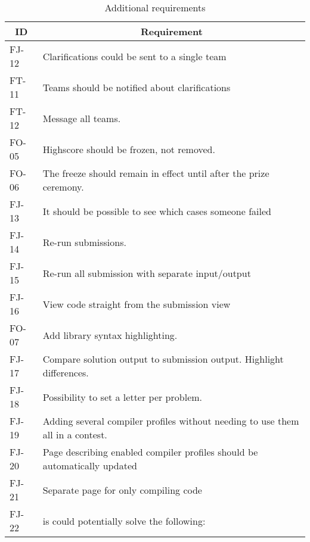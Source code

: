 \pagebreak
\begin{longtable}{|l|p{12.5cm}|}
\caption{Additional requirements} \label{table:addreqs} \\
\hline
\multicolumn{1}{|c|}{\textbf{ID}} &
\multicolumn{1}{c|}{\textbf{Requirement}} \\
\hline

FJ-12 & Clarifications could be sent to a single team \\
\hline

FT-11 & Teams should be notified about clarifications \\
\hline

FT-12 & Message all teams. \\
\hline

FO-05 & Highscore should be frozen, not removed.  \\
\hline

FO-06 & The freeze should remain in effect until after the prize ceremony. \\
\hline

FJ-13 & It should be possible to see which cases someone failed \\
\hline

FJ-14 & Re-run submissions.  \\
\hline

FJ-15 & Re-run all submission with separate input/output  \\
\hline

FJ-16 & View code straight from the submission view \\
\hline

FO-07 & Add library syntax highlighting.  \\
\hline

FJ-17 & Compare solution output to submission output. Highlight differences.  \\
\hline

FJ-18 & Possibility to set a letter per problem.  \\
\hline

FJ-19 & Adding several compiler profiles without needing to use them all in a contest.  \\
\hline

FJ-20 & Page describing enabled compiler profiles should be automatically updated \\
\hline

FJ-21 & Separate page for only compiling code \\
\hline

FJ-22 & is could potentially solve the following: \\
\hline


\end{longtable}
